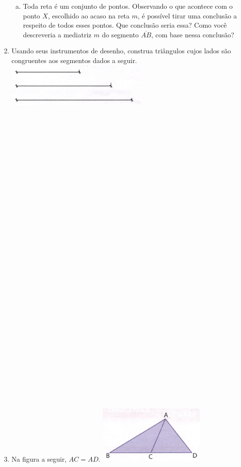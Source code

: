 \documentclass[a4paper,14pt]{article}
\begin{document}
\begin{multicols}{2}
\begin{enumerate}
\begin{enumerate}[a)]
				\item Toda reta é um conjunto de pontos. Observando o que acontece com o ponto $X$, escolhido ao acaso na reta $m$, é possível tirar uma conclusão a respeito de todos esses pontos. Que conclusão seria essa? Como você descreveria a mediatriz $m$ do segmento $\overline{AB}$, com base nessa conclusão? \newpage
			\end{enumerate}
			\item Usando seus instrumentos de desenho, construa triângulos cujos lados são congruentes aos segmentos dados a seguir. \\
			\includegraphics[width=1\linewidth]{6FMA123_imagens/imagem3} \\\\\\\\\\\\\\\\\\\\\\\\\\\\\\\\\\\\\\\\\\\\\\\\\\\\\\\\\\\\\\\\
			\item Na figura a seguir, $AC = AD$.
			\includegraphics[width=1\linewidth]{6FMA123_imagens/imagem4}

\end{enumerate}
\end{multicols}
\end{document}
